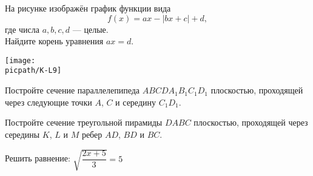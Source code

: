 \begin{homework}[number=1]
	\begin{listofex}
		\item
		\begin{minipage}[t]{\bodywidth}
			На рисунке изображён график функции вида \[ f(x)=ax-|bx+c|+d, \] где числа \(a, b, c, d\) --- целые.\\ Найдите корень уравнения \(ax=d\).
		\end{minipage}
		\hspace{0.02\linewidth}
		\begin{minipage}[t]{\picwidth}
			\texttt{[image: \\picpath/K-L9]}
		\end{minipage}
		\item Постройте сечение параллелепипеда \( ABCDA_1B_1C_1D_1 \)
		плоскостью, проходящей через следующие точки \( A \), \( C \) и середину \( C_1D_1 \).
		\item Постройте сечение треугольной пирамиды \( DABC \) плоскостью,
		проходящей через середины \( K \), \( L \) и \( M \) ребер \( AD \), \( BD \) и \( BC \).
		\item Решить равнение: \( \sqrt{\dfrac{2x+5}{3}}=5 \)

\end{listofex}
\end{homework}
